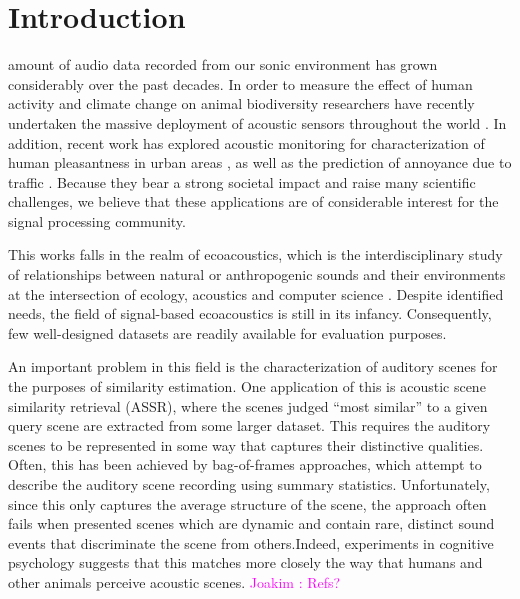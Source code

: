 \documentclass[journal]{IEEEtran}
\newcommand{\ja}[1]{\textcolor{magenta}{Joakim : #1}}
\begin{document}
%
\IEEEpeerreviewmaketitle

\section{Introduction}

 amount of audio data recorded from our sonic environment has grown considerably over the past decades.
In order to measure the effect of human activity and climate change on animal biodiversity researchers have recently undertaken the massive deployment of acoustic sensors throughout the world \cite{warren2006urban, NessSST13, stowell13b}. 
In addition, recent work has explored acoustic monitoring for characterization of human pleasantness in urban areas \cite{guyot2005urban, ricciardi2015sound}, as well as the prediction of annoyance due to traffic \cite{gloaguen}.
Because they bear a strong societal impact and raise many scientific challenges, we believe that these applications are of considerable interest for the signal processing community.

This works falls in the realm of ecoacoustics, which is the interdisciplinary study of relationships between natural or anthropogenic sounds and their environments at the intersection of ecology, acoustics and computer science \cite{krause}. Despite identified needs, the field of signal-based ecoacoustics is still in its infancy.
Consequently, few well-designed datasets are readily available for evaluation purposes.

An important problem in this field is the characterization of auditory scenes for the purposes of similarity estimation. One application of this is acoustic scene similarity retrieval (ASSR), where the scenes judged ``most similar'' to a given query scene are extracted from some larger dataset. This requires the auditory scenes to be represented in some way that captures their distinctive qualities. Often, this has been achieved by bag-of-frames approaches, which attempt to describe the auditory scene recording using summary statistics. Unfortunately, since this only captures the average structure of the scene, the approach often fails when presented scenes which are dynamic and contain rare, distinct sound events that discriminate the scene from others.Indeed, experiments in cognitive psychology suggests that this matches more closely the way that humans and other animals perceive acoustic scenes. \ja{Refs?}
\end{document}
